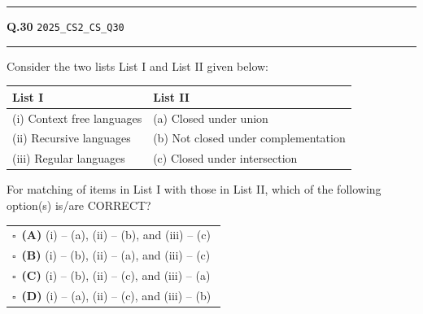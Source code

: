 \documentclass[a4paper,10pt]{article}
\begin{document}
\vspace{6pt}\hrule height 0.35pt\vspace{6pt}
\noindent
\begin{tcolorbox}[
    blanker,
    sidebyside,
    sidebyside align=top,
    lefthand width=0.55\textwidth,
    top=4pt, bottom=4pt, left=0pt, right=0pt,
    middle=16pt,
    underlay={
        \draw[dashed, black!80, line width=0.8pt, dash pattern=on 4pt off 3pt]
            ([xshift=0.55\textwidth+8pt]frame.north west) --
            ([xshift=0.55\textwidth+8pt]frame.south west);
    }
]
\textbf{Q.30}  \hfill {\tiny\texttt{2025\_CS2\_CS\_Q30}}
\vspace{2pt}\hrule height 0.3pt\vspace{4pt}

Consider the two lists List I and List II given below:
\par\medskip
\begin{center}\small
\begin{tabular}{ll}
\toprule
List I & List II \\
\midrule
(i) Context free languages & (a) Closed under union \\
(ii) Recursive languages & (b) Not closed under complementation \\
(iii) Regular languages & (c) Closed under intersection \\
\bottomrule
\end{tabular}\end{center}
\par\medskip
For matching of items in List I with those in List II, which of the following option(s) is/are CORRECT?

\par\vspace{6pt}\noindent
\begin{tabular}{@{}p{0.98\linewidth}@{}}
$\square$\ \textbf{(A)} (i) – (a), (ii) – (b), and (iii) – (c) \\
\addlinespace[3pt]
$\square$\ \textbf{(B)} (i) – (b), (ii) – (a), and (iii) – (c) \\
\addlinespace[3pt]
$\square$\ \textbf{(C)} (i) – (b), (ii) – (c), and (iii) – (a) \\
\addlinespace[3pt]
$\square$\ \textbf{(D)} (i) – (a), (ii) – (c), and (iii) – (b)
\end{tabular}

\tcblower


\end{tcolorbox}
\end{document}
